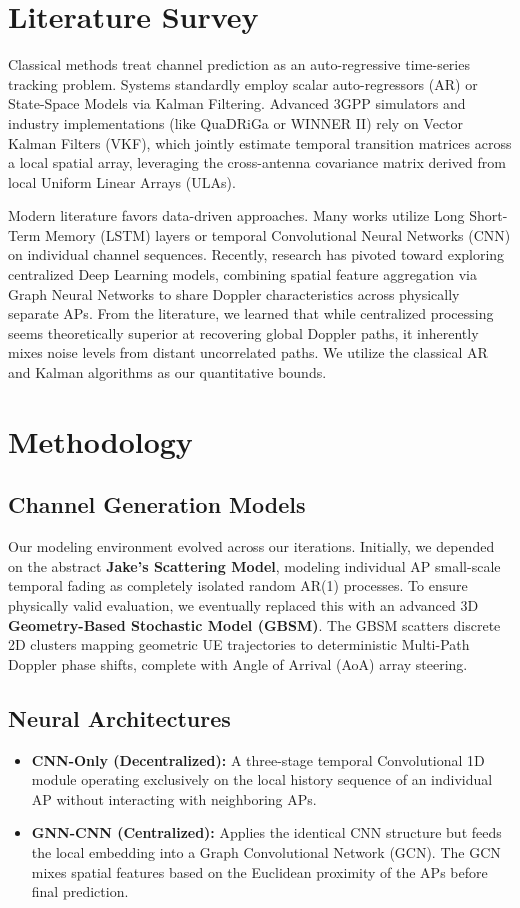 \documentclass[conference]{IEEEtran}
\begin{document}
\section{Literature Survey}
Classical methods treat channel prediction as an auto-regressive time-series tracking problem. Systems standardly employ scalar auto-regressors (AR) or State-Space Models via Kalman Filtering. 
Advanced 3GPP simulators and industry implementations (like QuaDRiGa or WINNER II) rely on Vector Kalman Filters (VKF), which jointly estimate temporal transition matrices across a local spatial array, leveraging the cross-antenna covariance matrix derived from local Uniform Linear Arrays (ULAs).

Modern literature favors data-driven approaches. Many works utilize Long Short-Term Memory (LSTM) layers or temporal Convolutional Neural Networks (CNN) on individual channel sequences. Recently, research has pivoted toward exploring centralized Deep Learning models, combining spatial feature aggregation via Graph Neural Networks to share Doppler characteristics across physically separate APs.
From the literature, we learned that while centralized processing seems theoretically superior at recovering global Doppler paths, it inherently mixes noise levels from distant uncorrelated paths. We utilize the classical AR and Kalman algorithms as our quantitative bounds.

\section{Methodology}
\subsection{Channel Generation Models}
Our modeling environment evolved across our iterations. Initially, we depended on the abstract \textbf{Jake's Scattering Model}, modeling individual AP small-scale temporal fading as completely isolated random AR(1) processes.
To ensure physically valid evaluation, we eventually replaced this with an advanced 3D \textbf{Geometry-Based Stochastic Model (GBSM)}. The GBSM scatters discrete 2D clusters mapping geometric UE trajectories to deterministic Multi-Path Doppler phase shifts, complete with Angle of Arrival (AoA) array steering.

\subsection{Neural Architectures}
\begin{itemize}
    \item \textbf{CNN-Only (Decentralized):} A three-stage temporal Convolutional 1D module operating exclusively on the local history sequence of an individual AP without interacting with neighboring APs.
    \item \textbf{GNN-CNN (Centralized):} Applies the identical CNN structure but feeds the local embedding into a Graph Convolutional Network (GCN). The GCN mixes spatial features based on the Euclidean proximity of the APs before final prediction.
\end{itemize}
\end{document}
